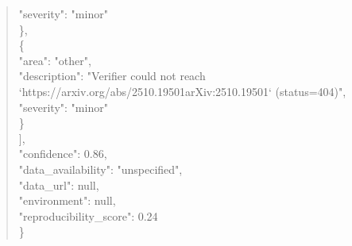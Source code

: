 \documentclass[11pt]{article}
\begin{document}
\begin{quote}
      "severity": "minor"\\
    \},\\
    \{\\
      "area": "other",\\
      "description": "Verifier could not reach `https://arxiv.org/abs/2510.19501arXiv:2510.19501` (status=404)",\\
      "severity": "minor"\\
    \}\\
  ],\\
  "confidence": 0.86,\\
  "data\_availability": "unspecified",\\
  "data\_url": null,\\
  "environment": null,\\
  "reproducibility\_score": 0.24\\
\}\\
\end{quote}
\end{document}
